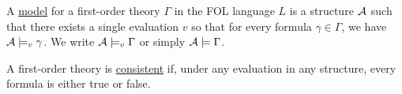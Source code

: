 \begin{definition}\label{def:first_order_model}\cite[28]{Lectures:logic_programming}
  A \uline{model} for a first-order theory $\Gamma$ in the FOL language $L$ is a structure $\mathcal A$ such that there exists a single evaluation $v$ so that for every formula $\gamma \in \Gamma$, we have $\mathcal A \models_v \gamma$. We write $\mathcal A \models_v \Gamma$ or simply $\mathcal A \models \Gamma$.
\end{definition}

\begin{definition}\label{def:first_order_consistent}
  A first-order theory is \uline{consistent} if, under any evaluation in any structure, every formula is either true or false.
\end{definition}
